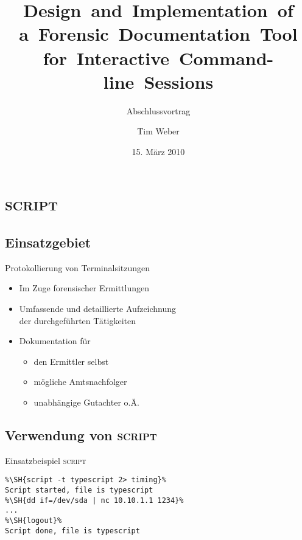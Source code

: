 \documentclass[ignorenonframetext,ucs]{beamer}
\title{Design~and~Implementation~of a~Forensic~Documentation~Tool for~Interactive~Command\mbox{-}line~Sessions}
\subtitle{Abschlussvortrag}
\author{Tim Weber}
\date{15. März 2010}
\newcommand\SH[1]{{\color{green}\$ }{\color{white}#1}}
\def\cmd{\textsc}
\begin{document}
\begin{frame}\maketitle\end{frame}


\section{\cmd{script}}

\subsection{Einsatzgebiet}

\begin{frame}{Protokollierung von Terminalsitzungen}
\begin{itemize}
\item Im Zuge forensischer Ermittlungen
\item Umfassende und detaillierte Aufzeichnung \\ der durchgeführten Tätigkeiten
\item Dokumentation für\begin{itemize}
\item den Ermittler selbst
\item mögliche Amtsnachfolger
\item unabhängige Gutachter o.Ä.\end{itemize}
\end{itemize}
\end{frame}

\subsection{Verwendung von \cmd{script}}

\begin{frame}[fragile=singleslide]{Einsatzbeispiel \cmd{script}}
\begin{example}
\begin{lstlisting}
%\SH{script -t typescript 2> timing}%
Script started, file is typescript
%\SH{dd if=/dev/sda | nc 10.10.1.1 1234}%
...
%\SH{logout}%
Script done, file is typescript
\end{lstlisting}
\end{example}
\end{frame}
\end{document}
